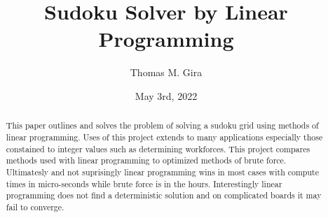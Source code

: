 \documentclass[12pt]{article}
\title{Sudoku Solver by Linear Programming}
\author{Thomas M. Gira}
\date{May 3rd, 2022}
\begin{document}
\maketitle
\begin{abstract}
This paper outlines and solves the problem of solving a sudoku grid using methods of linear programming.
Uses of this project extends to many applications especially those constained to integer values such as determining workforces. 
This project compares methods used with linear programming to optimized methods of brute force. Ultimatesly and not
suprisingly linear programming wins in most cases with compute times in micro-seconds while brute force is in the hours.
Interestingly linear programming does not find a deterministic solution and on complicated boards it may fail to converge.
\end{abstract}
\end{document}
